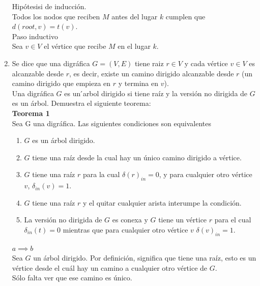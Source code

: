 \documentclass[12pt,a4paper]{report}
\begin{document}
\begin{enumerate}
{			Hipótesisi de inducción.\\
			Todos los nodos que reciben $M$ antes del lugar $k$ cumplen que
			$d(root, v) = t(v)$.\\

			Paso inductivo\\
			Sea $v \in V$ el vértice que recibe $M$ en el lugar $k$.

		}
		\item{
			Se dice que una digráfica $G = (V, E)$ tiene raiz $r \in V$ y cada
			vértice $v \in V$ es alcanzable desde $r$, es decir, existe un camino
			dirigido alcanzable desde $r$ (un camino dirigido que empieza en $r$ y
			termina en $v$).\\
			Una digráfica $G$ es un  ́arbol dirigido si tiene raíz y la versión no dirigida
			de $G$ es un árbol. Demuestra el siguiente teorema:\\

			\textbf{Teorema 1}\\
			Sea G una digráfica. Las siguientes condiciones son equivalentes
			\begin{enumerate} [label = \alph*)]
				\item {
					$G$ es un árbol dirigido.\\
				}
				\item {
					$G$ tiene una raíz desde la cual hay un único camino dirigido a
					vértice.\\
				}

				\item{
					$G$ tiene una raíz $r$ para la cual $\delta(r)_{in} = 0$, y para cualquier
					otro vértice $v$, $\delta_{in}(v) = 1$.\\
				}

				\item{
					$G$ tiene una raíz $r$ y el quitar cualquier arista interumpe la
					condición.\\
				}
				\item{
					La versión no dirigida de $G$ es conexa y $G$ tiene un vértice $r$ para
					el cual $\delta_{in}(t) = 0$ mientras que para cualquier otro vértice
					$v$ $\delta(v)_{in} = 1$.\\
				}
			\end{enumerate}

			$a \implies b$\\
			Sea $G$ un árbol dirigido. Por definición, significa que tiene una raíz,
			esto es un vértice desde el cuál hay un camino a cualquier otro vértice de
			$G$.\\
			Sólo falta ver que ese camino es único.\\

}
\end{enumerate}
\end{document}
